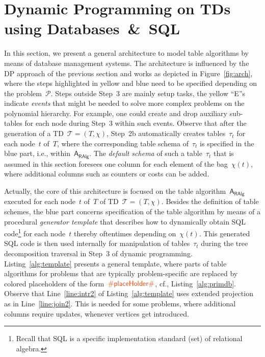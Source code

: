 \documentclass{llncs}
\newcommand{\inputPredColor}{orange!55!red}
\newcommand{\algo}[1]{\ensuremath{\mathsf{#1}}}
\newcommand{\tab}[1]{\ensuremath{\tau_{#1}}}
\begin{document}
\section{Dynamic Programming on TDs using Databases~\&~SQL}
%
%
%
%
In this section, we present a general architecture to model table algorithms
by means of database management systems.
The architecture is influenced by the DP approach of the previous section
and works as depicted in Figure~\ref{fig:arch},
where the steps highlighted in yellow and blue need to be specified
depending on the problem~$\mathcal{P}$. Steps outside Step~3 are mainly setup tasks,
the yellow ``E''s indicate \emph{events} that might be needed to solve more complex problems
on the polynomial hierarchy. 
For example, one could create and drop auxiliary sub-tables for each node during Step~3 within such events.
Observe that after the generation of a TD~$\mathcal{T}=(T,\chi)$, 
Step~2b automatically creates tables~$\tab{t}$ for each node~$t$ of~$T$,
where the corresponding table schema of~$\tab{t}$ is specified in the blue part, i.e., 
within~$\algo{A_{RAlg}}$. 
The \emph{default schema} of such a table~$\tab{t}$ that is assumed in this section foresees one column for each element of the bag~$\chi(t)$, where additional columns such as counters or costs can be added.

Actually, the core of this architecture is focused on the table algorithm~$\algo{A_{RAlg}}$ executed for each node~$t$ of~$T$ of TD~$\mathcal{T}=(T,\chi)$. 
Besides the definition of table schemes, the blue part concerns specification of the table algorithm by means of a procedural \emph{generator template} that describes 
how to dynamically obtain SQL code\footnote{Recall that SQL is a specific implementation standard (set) of relational algebra.} for each node~$t$ thereby oftentimes depending on~$\chi(t)$.
This generated SQL code is then used internally for manipulation of 
tables~$\tab{t}$ during the tree decomposition 
traversal in Step~3 of dynamic programming.
%
Listing~\ref{alg:template} presents a general template, where parts of table algorithms for problems that are typically problem-specific are replaced by colored placeholders of the form~$\textcolor{\inputPredColor}{\#\mathsf{placeHolder}\#}$, cf., Listing~\ref{alg:primdb}.
Observe that Line~\ref{line:intr2} of Listing~\ref{alg:template}
uses extended projection as in Line~\ref{line:join2}. %
This is needed for some problems, where additional columns require updates, 
whenever vertices get introduced.
\end{document}
